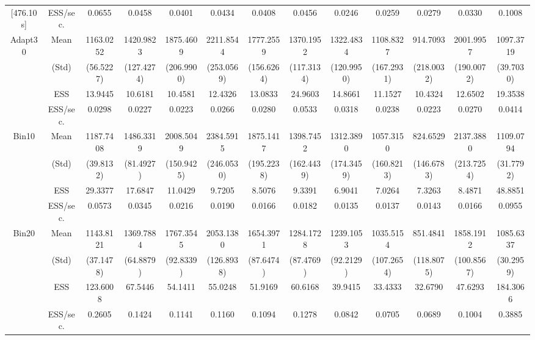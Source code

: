 {{{\begin{table}
{\begin{tabular}{cc ccc ccc ccc cc}
[476.10 s]  & ESS/sec. 
& 0.0655 & 0.0458 & 0.0401 & 0.0434 & 0.0408 & 0.0456 & 0.0246 & 0.0259 & 0.0279 & 0.0330 & 0.1008  \\  [1.3ex] 
\rowcolor{LightCyan} 
Adapt30 & Mean 
 & 1163.0252  & 1420.9823  & 1875.4609  & 2211.8544  & 1777.2559  & 1370.1952  & 1322.4834  & 1108.8327  & 914.7093  & 2001.9957  & 1097.3719  \\  [0.75ex] 
 & (Std) 
 & (56.5227)  & (127.4274)  & (206.9900)  & (253.0569)  & (156.6264)  & (117.3134)  & (120.9950)  & (167.2931)  & (218.0032)  & (190.0072)  & (39.7030)  \\  [0.75ex] 
 & ESS 
 & 13.9445  & 10.6181  & 10.4581  & 12.4326  & 13.0833  & 24.9603  & 14.8661  & 11.1527  & 10.4324  & 12.6502  & 19.3538  \\  [0.75ex] 
[468.01 s]  & ESS/sec. 
& 0.0298 & 0.0227 & 0.0223 & 0.0266 & 0.0280 & 0.0533 & 0.0318 & 0.0238 & 0.0223 & 0.0270 & 0.0414  \\  [1.3ex] 
\rowcolor{LightCyan} 
Bin10 & Mean 
 & 1187.7408  & 1486.3319  & 2008.5049  & 2384.5915  & 1875.1417  & 1398.7452  & 1312.3890  & 1057.3150  & 824.6529  & 2137.3880  & 1109.0794  \\  [0.75ex] 
 & (Std) 
 & (39.8132)  & (81.4927)  & (150.9425)  & (246.0530)  & (195.2238)  & (162.4439)  & (174.3459)  & (160.8213)  & (146.6783)  & (213.7254)  & (31.7792)  \\  [0.75ex] 
 & ESS 
 & 29.3377  & 17.6847  & 11.0429  & 9.7205  & 8.5076  & 9.3391  & 6.9041  & 7.0264  & 7.3263  & 8.4871  & 48.8851  \\  [0.75ex] 
[511.87 s]  & ESS/sec. 
& 0.0573 & 0.0345 & 0.0216 & 0.0190 & 0.0166 & 0.0182 & 0.0135 & 0.0137 & 0.0143 & 0.0166 & 0.0955  \\  [1.3ex] 
\rowcolor{LightCyan} 
Bin20 & Mean 
 & 1143.8121  & 1369.7884  & 1767.3545  & 2053.1380  & 1654.3971  & 1284.1728  & 1239.1053  & 1035.5154  & 851.4841  & 1858.1912  & 1085.6337  \\  [0.75ex] 
 & (Std) 
 & (37.1478)  & (64.8879)  & (92.8339)  & (126.8938)  & (87.6474)  & (87.4769)  & (92.2129)  & (107.2654)  & (118.8075)  & (100.8567)  & (30.2959)  \\  [0.75ex] 
 & ESS 
 & 123.6008  & 67.5446  & 54.1411  & 55.0248  & 51.9169  & 60.6168  & 39.9415  & 33.4333  & 32.6790  & 47.6293  & 184.3066  \\  [0.75ex] 
[474.46 s]  & ESS/sec. 
& 0.2605 & 0.1424 & 0.1141 & 0.1160 & 0.1094 & 0.1278 & 0.0842 & 0.0705 & 0.0689 & 0.1004 & 0.3885  \\  [1.3ex] 

\end{tabular}}
\end{table}}}}
